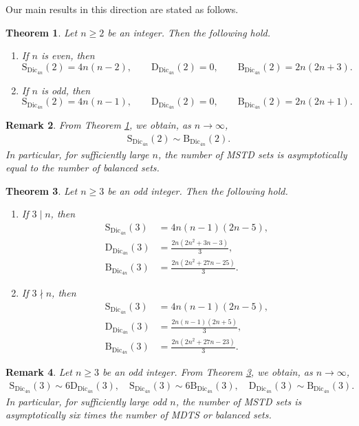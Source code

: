 \documentclass[11pt,reqno]{amsart}
\numberwithin{equation}{section}
\newtheorem{theorem}{Theorem}[section]
\newtheorem{remark}[theorem]{Remark}
\begin{document}
Our main results in this direction are stated as follows.
\begin{theorem}\label{Theorem1.0}
Let $n\geq2$ be an integer. Then the following hold.
\begin{enumerate}
    \item[\upshape(1)] If $n$ is even, then
    $$
    \mathrm{S}_{\mathrm{Dic}_{4n}}(2)=4n(n-2), \qquad
    \mathrm{D}_{\mathrm{Dic}_{4n}}(2)=0, \qquad
    \mathrm{B}_{\mathrm{Dic}_{4n}}(2)=2n(2n+3).
    $$
    \item[\upshape(2)] If $n$ is odd, then
    $$
    \mathrm{S}_{\mathrm{Dic}_{4n}}(2)=4n(n-1), \qquad
    \mathrm{D}_{\mathrm{Dic}_{4n}}(2)=0, \qquad
    \mathrm{B}_{\mathrm{Dic}_{4n}}(2)=2n(2n+1).
    $$
\end{enumerate}
\end{theorem}
\begin{remark}
From Theorem \ref{Theorem1.0}, we obtain, as $n \to \infty$,
$$
  \begin{aligned}
    \mathrm{S}_{\mathrm{Dic}_{4n}}(2) \sim \mathrm{B}_{\mathrm{Dic}_{4n}}(2).
 \end{aligned}$$
 In particular, for sufficiently large $n$, the number of MSTD sets is asymptotically equal to the number of balanced sets.
\end{remark}
\begin{theorem}\label{Theorem1.1}
Let $n\geq3$ be an odd integer. Then the following hold. 
\begin{enumerate}
    \item[\upshape(1)] If $3 \mid n$, then
    $$
    \begin{aligned}
    \mathrm{S}_{\mathrm{Dic}_{4n}}(3) &= 4n(n-1)(2n-5),\\
    \mathrm{D}_{\mathrm{Dic}_{4n}}(3) &= \frac{2n(2n^2+3n-3)}{3},\\
    \mathrm{B}_{\mathrm{Dic}_{4n}}(3) &= \frac{2n(2n^2+27n-25)}{3}.
    \end{aligned}
    $$
    \item[\upshape(2)] If $3 \nmid n$, then
    $$
    \begin{aligned}
    \mathrm{S}_{\mathrm{Dic}_{4n}}(3) &= 4n(n-1)(2n-5),\\
    \mathrm{D}_{\mathrm{Dic}_{4n}}(3) &= \frac{2n(n-1)(2n+5)}{3},\\
    \mathrm{B}_{\mathrm{Dic}_{4n}}(3) &= \frac{2n(2n^2+27n-23)}{3}.
    \end{aligned}
    $$
\end{enumerate}
\end{theorem}
\begin{remark}
Let $n\geq 3$ be an odd integer. From Theorem \ref{Theorem1.1}, we obtain, as $n \to \infty$,
$$
  \begin{aligned}
    \mathrm{S}_{\mathrm{Dic}_{4n}}(3) \sim 6 \mathrm{D}_{\mathrm{Dic}_{4n}}(3),\quad  \mathrm{S}_{\mathrm{Dic}_{4n}}(3) \sim 6 \mathrm{B}_{\mathrm{Dic}_{4n}}(3),\quad  \mathrm{D}_{\mathrm{Dic}_{4n}}(3) \sim  \mathrm{B}_{\mathrm{Dic}_{4n}}(3).
 \end{aligned}$$
 In particular, for sufficiently large odd $n$, the number of MSTD sets is asymptotically six times the number of MDTS or balanced sets.
\end{remark}
\end{document}
